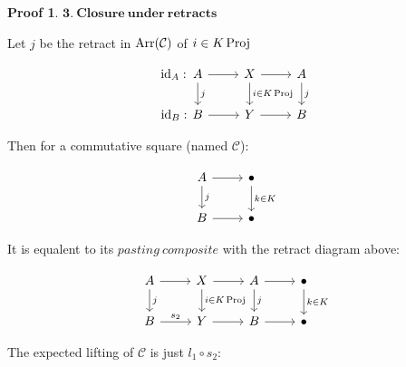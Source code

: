 \documentclass[a4paper]{article}
\theoremstyle{plain}
\theoremstyle{definition}
\newtheorem*{prf}{Proof}
\theoremstyle{remark}
\newcommand{\mc}[1]{\mathcal{#1}}
\newcommand{\ms}[1]{\mathscr{#1}}
\newcommand{\mbf}[1]{\mathbf{#1}}
\newcommand{\mcC}{\mc C}
\newcommand{\msC}{\ms C}
\newcommand{\id}{\mathrm{id}}
\DeclareMathOperator{\Proj}{\rm{Proj}}
\DeclareMathOperator{\Arr}{\rm{Arr}}
\begin{document}
\begin{prf}
        \par $\mbf{3.\ Closure\ under\ retracts}$\\

            \par Let $j$ be the retract in $\Arr(\mcC)$  of $i \in K \Proj$

            \[\begin{tikzcd}
                A & X & A \\
                B & Y & B
                \arrow["{i\in K \Proj}", from=1-2, to=2-2]
                \arrow[from=1-2, to=1-3]
                \arrow[from=2-2, to=2-3]
                \arrow["\id_A : \hspace*{2.77cm}"{marking}, from=1-1, to=1-2]
                \arrow["\id_B : \hspace*{2.77cm}"{marking}, from=2-1, to=2-2]
                \arrow["j", from=1-1, to=2-1]
                \arrow["j", from=1-3, to=2-3]
            \end{tikzcd}\]

            Then for a commutative square (named $\msC$):

            \[\begin{tikzcd}
                A & \bullet \\
                B & \bullet
                \arrow["{k\in K}", from=1-2, to=2-2]
                \arrow[from=1-1, to=1-2]
                \arrow[from=2-1, to=2-2]
                \arrow["j", from=1-1, to=2-1]
            \end{tikzcd}\]

            It is equalent to its $pasting\ composite$ with the retract diagram above:

            \[\begin{tikzcd}
                A & X & A & \bullet \\
                B & Y & B & \bullet
                \arrow["{k\in K}", from=1-4, to=2-4]
                \arrow[from=1-3, to=1-4]
                \arrow[from=2-3, to=2-4]
                \arrow["j", from=1-3, to=2-3]
                \arrow[from=1-2, to=1-3]
                \arrow[from=2-2, to=2-3]
                \arrow["{i \in K \Proj}", from=1-2, to=2-2]
                \arrow[from=1-1, to=1-2]
                \arrow["j", from=1-1, to=2-1]
                \arrow["s_2",from=2-1, to=2-2]
            \end{tikzcd}\]

            The expected lifting of $\msC$ is just $l_1 \circ s_2$:


\end{prf}
\end{document}
